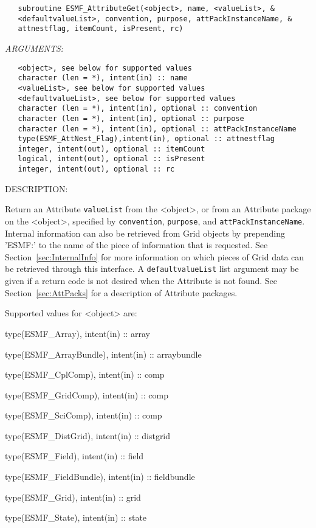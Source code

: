   
\begin{verbatim}   subroutine ESMF_AttributeGet(<object>, name, <valueList>, &
   <defaultvalueList>, convention, purpose, attPackInstanceName, &
   attnestflag, itemCount, isPresent, rc)\end{verbatim}{\em ARGUMENTS:}
\begin{verbatim}   <object>, see below for supported values
   character (len = *), intent(in) :: name
   <valueList>, see below for supported values
   <defaultvalueList>, see below for supported values
   character (len = *), intent(in), optional :: convention
   character (len = *), intent(in), optional :: purpose
   character (len = *), intent(in), optional :: attPackInstanceName
   type(ESMF_AttNest_Flag),intent(in), optional :: attnestflag
   integer, intent(out), optional :: itemCount
   logical, intent(out), optional :: isPresent
   integer, intent(out), optional :: rc\end{verbatim}
{\sf DESCRIPTION:\\ }


   Return an Attribute {\tt valueList} from the <object>, or from an
   Attribute package on the <object>, specified by {\tt convention},
   {\tt purpose}, and {\tt attPackInstanceName}. Internal
   information can also be retrieved from Grid objects by prepending 'ESMF:'
   to the name of the piece of information that is requested. See
   Section~\ref{sec:InternalInfo} for more information
   on which pieces of Grid data can be retrieved through this interface.
   A {\tt defaultvalueList} list argument may be given if
   a return code is not desired when the Attribute is not found.
   See Section~\ref{sec:AttPacks} for a description of Attribute packages.
  
   Supported values for <object> are:
   \begin{description}
   \item type(ESMF\_Array), intent(in) :: array
   \item type(ESMF\_ArrayBundle), intent(in) :: arraybundle
   \item type(ESMF\_CplComp), intent(in) :: comp
   \item type(ESMF\_GridComp), intent(in) :: comp
   \item type(ESMF\_SciComp), intent(in) :: comp
   \item type(ESMF\_DistGrid), intent(in) :: distgrid
   \item type(ESMF\_Field), intent(in) :: field
   \item type(ESMF\_FieldBundle), intent(in) :: fieldbundle
   \item type(ESMF\_Grid), intent(in) :: grid
   \item type(ESMF\_State), intent(in) :: state
   \end{description}
  
